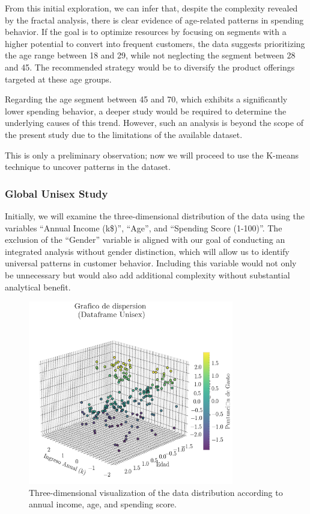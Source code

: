 \documentclass[10pt]{article}
\begin{document}
From this initial exploration, we can infer that, despite the complexity revealed by the fractal analysis, there is clear evidence of age-related patterns in spending behavior. If the goal is to optimize resources by focusing on segments with a higher potential to convert into frequent customers, the data suggests prioritizing the age range between 18 and 29, while not neglecting the segment between 28 and 45. The recommended strategy would be to diversify the product offerings targeted at these age groups.

Regarding the age segment between 45 and 70, which exhibits a significantly lower spending behavior, a deeper study would be required to determine the underlying causes of this trend. However, such an analysis is beyond the scope of the present study due to the limitations of the available dataset.

This is only a preliminary observation; now we will proceed to use the K-means technique to uncover patterns in the dataset.


\subsubsection{Global Unisex Study}

Initially, we will examine the three-dimensional distribution of the data using the variables “Annual Income (k\$)”, “Age”, and “Spending Score (1-100)”. The exclusion of the “Gender” variable is aligned with our goal of conducting an integrated analysis without gender distinction, which will allow us to identify universal patterns in customer behavior. Including this variable would not only be unnecessary but would also add additional complexity without substantial analytical benefit.

\begin{figure}[h]
    \centering
    \includegraphics[width=0.8\textwidth]{plots_investing/Grafico 5.png}
    \caption{Three-dimensional visualization of the data distribution according to annual income, age, and spending score.}
    \label{fig:miGrafico5}
\end{figure}
\end{document}
